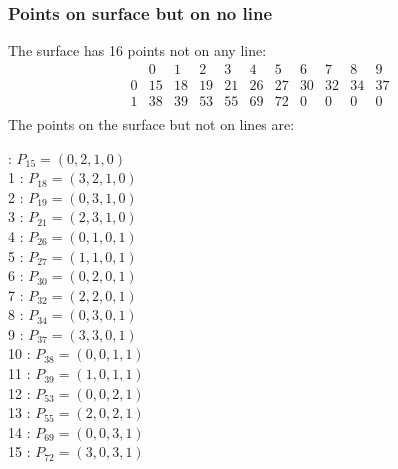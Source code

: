 \documentclass{article}
\begin{document}
{\subsubsection*{Points on surface but on no line}
The surface has 16 points not on any line:\\
$$
\begin{array}{r|*{10}{r}}
 & 0 & 1 & 2 & 3 & 4 & 5 & 6 & 7 & 8 & 9\\
\hline
0 & 15 & 18 & 19 & 21 & 26 & 27 & 30 & 32 & 34 & 37\\
1 & 38 & 39 & 53 & 55 & 69 & 72 & 0 & 0 & 0 & 0\\
\end{array}
$$
The points on the surface but not on lines are:\\
\begin{multicols}{2}
 : $P_{15}=( 0, 2, 1, 0 )$\\
1 : $P_{18}=( 3, 2, 1, 0 )$\\
2 : $P_{19}=( 0, 3, 1, 0 )$\\
3 : $P_{21}=( 2, 3, 1, 0 )$\\
4 : $P_{26}=( 0, 1, 0, 1 )$\\
5 : $P_{27}=( 1, 1, 0, 1 )$\\
6 : $P_{30}=( 0, 2, 0, 1 )$\\
7 : $P_{32}=( 2, 2, 0, 1 )$\\
8 : $P_{34}=( 0, 3, 0, 1 )$\\
9 : $P_{37}=( 3, 3, 0, 1 )$\\
10 : $P_{38}=( 0, 0, 1, 1 )$\\
11 : $P_{39}=( 1, 0, 1, 1 )$\\
12 : $P_{53}=( 0, 0, 2, 1 )$\\
13 : $P_{55}=( 2, 0, 2, 1 )$\\
14 : $P_{69}=( 0, 0, 3, 1 )$\\
15 : $P_{72}=( 3, 0, 3, 1 )$\\
\end{multicols}
}
\end{document}
